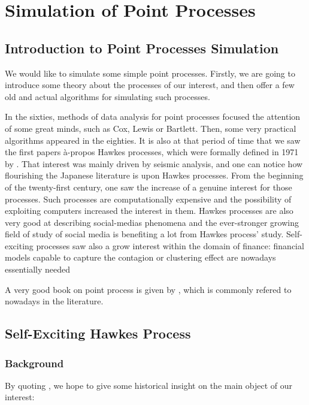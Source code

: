 \part{Simulation of Point Processes}
\chapter{Introduction to Point Processes Simulation}
We would like to simulate some simple point processes. Firstly, we are going to introduce some theory about the processes of our interest, and then offer a few old and actual algorithms for simulating such processes. 

In the sixties, methods of data analysis for point processes focused the attention of some great minds, such as Cox, Lewis or Bartlett. Then, some very practical algorithms appeared in the eighties. It is also at that period of time that we saw the first papers à-propos Hawkes processes, which were formally defined in 1971 by \cite{Hawkes}. That interest was mainly driven by seismic analysis, and one can notice how flourishing the Japanese literature is upon Hawkes processes. From the beginning of the twenty-first century, one saw the increase of a genuine interest for those processes. Such processes are computationally expensive and the possibility of exploiting computers increased the interest in them. Hawkes processes are also very good at describing social-medias phenomena and the ever-stronger growing field of study of social media is benefiting a lot from Hawkes process' study. Self-exciting processes saw also a grow interest within the domain of finance: financial models capable to capture the contagion or clustering effect are nowadays essentially needed

A very good book on point process is given by \cite{daley}, which is commonly refered to nowadays in the literature.

\chapter{Self-Exciting Hawkes Process}
\section{Background}
By quoting \cite{simullaub}, we hope to give some historical insight on the main object of our interest:

